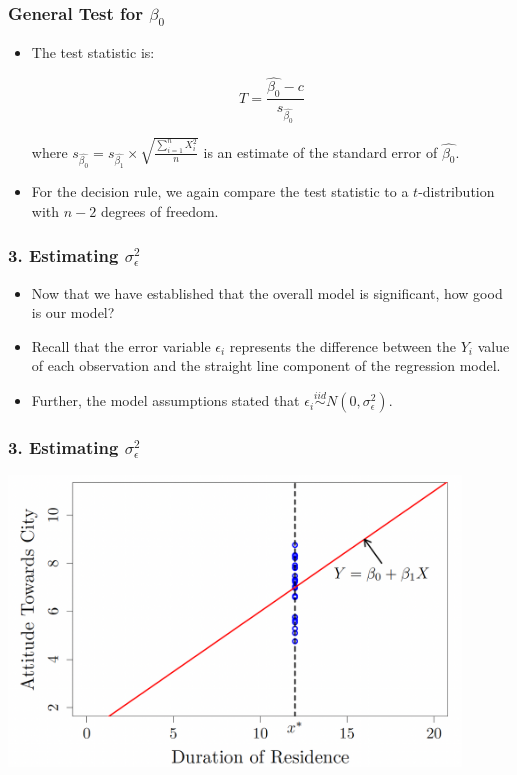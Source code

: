 \documentclass[12pt]{beamer}
\begin{document}
	\begin{frame}
		\frametitle{General Test for $\beta_0$}
		
		\begin{itemize}[label={\color{blue}$\blacktriangleright$}]
			\item The test statistic is:
			
			\[
			T = \frac{\hat{\beta_0} - c}{s_{\hat{\beta_0}}}
			\]
			
			where $s_{\hat{\beta_0}} = s_{\hat{\beta_1}} \times \sqrt{\frac{\sum_{i=1}^n X_i^2}{n}}$ is an estimate of the standard error of $\hat{\beta_0}$.
			
			\item For the decision rule, we again compare the test statistic to a $t$-distribution with $n-2$ degrees of freedom.
		\end{itemize}
	\end{frame}
	\begin{frame}
		\frametitle{3. Estimating $\sigma_\epsilon^2$}
		
		\begin{itemize}[label={\color{blue}$\blacktriangleright$}]
			\item Now that we have established that the overall model is significant, how good is our model?
			
			\item Recall that the error variable $\epsilon_i$ represents the difference between the $Y_i$ value of each observation and the straight line component of the regression model.
			
			\item Further, the model assumptions stated that $\epsilon_i \stackrel{iid}{\sim} N(0, \sigma_\epsilon^2)$.
		\end{itemize}
	\end{frame}
		\begin{frame}
		\frametitle{3. Estimating $\sigma_\epsilon^2$}
	\centering
\includegraphics[width=12cm]{sigma.png}
\end{frame}
\end{document}
